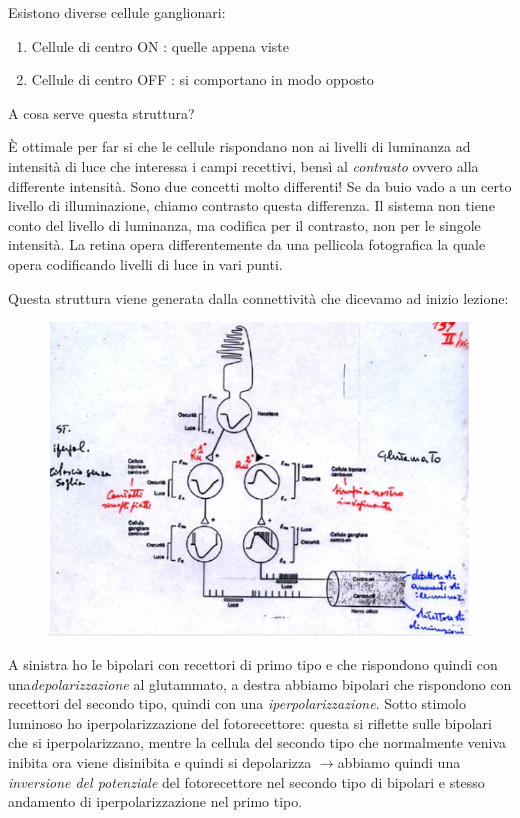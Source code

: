 \documentclass[a4paper,12pt]{article}
\newcommand{\lfreccia}{\ensuremath{\longrightarrow}}
\begin{document}
Esistono diverse cellule ganglionari:
\begin{enumerate}
\item{Cellule di centro ON : quelle appena viste}
\item{Cellule di centro OFF : si comportano in modo opposto}
\end{enumerate}

A cosa serve questa struttura?

È ottimale per far si che le cellule rispondano non ai livelli di luminanza ad intensità di luce che interessa i campi recettivi, bensì al \emph{contrasto} ovvero alla differente intensità. Sono due concetti molto differenti! Se da buio vado a un certo livello di illuminazione, chiamo contrasto questa differenza. Il sistema non tiene conto del livello di luminanza, ma codifica per il contrasto, non per le singole intensità. La retina opera differentemente da una pellicola fotografica la quale opera codificando livelli di luce in vari punti.

Questa struttura viene generata dalla connettività che dicevamo ad inizio lezione: 
\begin{figure}[H]
\centering
\includegraphics[scale=0.4]{immagine/antagonista.jpg}
\end{figure}

A sinistra ho le bipolari con recettori di primo tipo e che rispondono quindi con una\emph{depolarizzazione} al glutammato, a destra abbiamo bipolari che rispondono con recettori del secondo tipo, quindi con una \emph{iperpolarizzazione}. Sotto stimolo luminoso ho iperpolarizzazione del fotorecettore: questa si riflette sulle bipolari che si iperpolarizzano, mentre la cellula del secondo tipo che normalmente veniva inibita ora viene disinibita e quindi si depolarizza \lfreccia abbiamo quindi una \emph{inversione del potenziale} del fotorecettore nel secondo tipo di bipolari e stesso andamento di iperpolarizzazione nel primo tipo. 
\end{document}
